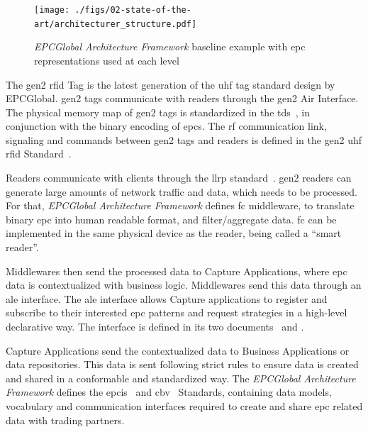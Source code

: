 \begin{figure}[!ht]
    \centering
    \texttt{[image: ./figs/02-state-of-the-art/architecturer\_structure.pdf]}
    \caption[\emph{EPCGlobal Architecture Framework} baseline example with \ac{epc} representations used at each level]{\emph{EPCGlobal Architecture Framework} baseline example with \ac{epc} representations used at each level~\cite{EPCTagData}} 
    \label{fig:archstructure}
\end{figure}

The \ac{gen2} \ac{rfid} Tag is the latest generation of the \ac{uhf} tag standard design by EPCGlobal. \ac{gen2} tags communicate with readers through the \ac{gen2} Air Interface. The physical memory map of \ac{gen2} tags is standardized in the \ac{tds}~\cite{EPCTagData}, in conjunction with the binary encoding of \acp{epc}. The \ac{rf} communication link, signaling and commands between \ac{gen2} tags and readers is defined in the \ac{gen2} \ac{uhf} \ac{rfid} Standard~\cite{UHFGen2Tag}.

Readers communicate with clients through the \ac{llrp} standard~\cite{LowLevelReader}. \ac{gen2} readers can generate large amounts of network traffic and data, which needs to be processed. For that, \emph{EPCGlobal Architecture Framework} defines \acf{fc} middleware, to translate binary \acs{epc} into human readable format, and filter/aggregate data. \ac{fc} can be implemented in the same physical device as the reader, being called a ``smart reader''. 

Middlewares then send the processed data to Capture Applications, where \ac{epc} data is contextualized with business logic. Middlewares send this data through an \ac{ale} interface. The \ac{ale} interface allows Capture applications to register and subscribe to their interested \ac{epc} patterns and request strategies in a high-level declarative way. The interface is defined in its two documents~\cite{ApplicationLevelEvents} and \cite{ApplicationLevelEventsa}.

Capture Applications send the contextualized data to Business Applications or data repositories.
This data is sent following strict rules to ensure data is created and shared in a conformable and standardized way. The \emph{EPCGlobal Architecture Framework} defines the \ac{epcis}~\cite{EPCInformationServices} and \ac{cbv}~\cite{CoreBusinessVocabulary} Standards, containing data models, vocabulary and communication interfaces required to create and share \ac{epc} related data with trading partners.

